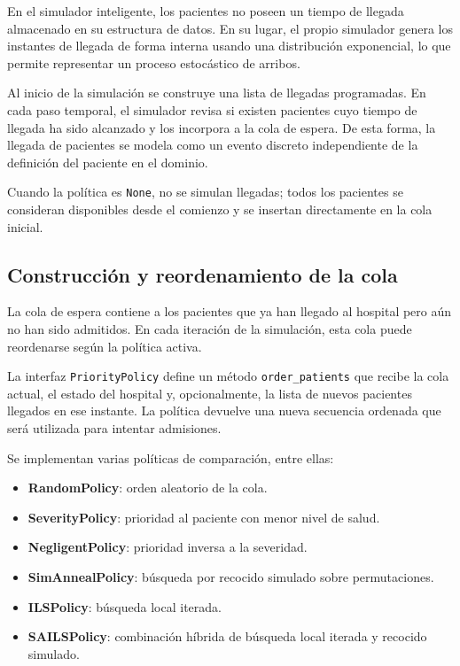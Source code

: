 \documentclass[12pt,a4paper]{article}
\begin{document}
En el simulador inteligente, los pacientes no poseen un tiempo de llegada almacenado en su estructura de datos. 
En su lugar, el propio simulador genera los instantes de llegada de forma interna usando una distribución exponencial, 
lo que permite representar un proceso estocástico de arribos.

Al inicio de la simulación se construye una lista de llegadas programadas. 
En cada paso temporal, el simulador revisa si existen pacientes cuyo tiempo de llegada ha sido alcanzado y 
los incorpora a la cola de espera. 
De esta forma, la llegada de pacientes se modela como un evento discreto independiente de la definición del 
paciente en el dominio.

Cuando la política es \texttt{None}, no se simulan llegadas; 
todos los pacientes se consideran disponibles desde el comienzo y se insertan directamente en la cola inicial.

\subsection{Construcción y reordenamiento de la cola}

La cola de espera contiene a los pacientes que ya han llegado al hospital pero aún no han sido admitidos. 
En cada iteración de la simulación, esta cola puede reordenarse según la política activa.

La interfaz \texttt{PriorityPolicy} define un método \texttt{order\_patients} que recibe la cola actual, 
el estado del hospital y, opcionalmente, la lista de nuevos pacientes llegados en ese instante. 
La política devuelve una nueva secuencia ordenada que será utilizada para intentar admisiones.

Se implementan varias políticas de comparación, entre ellas:

\begin{itemize}
    \item \textbf{RandomPolicy}: orden aleatorio de la cola.
    \item \textbf{SeverityPolicy}: prioridad al paciente con menor nivel de salud.
    \item \textbf{NegligentPolicy}: prioridad inversa a la severidad.
    \item \textbf{SimAnnealPolicy}: búsqueda por recocido simulado sobre permutaciones.
    \item \textbf{ILSPolicy}: búsqueda local iterada.
    \item \textbf{SAILSPolicy}: combinación híbrida de búsqueda local iterada y recocido simulado.
\end{itemize}
\end{document}
